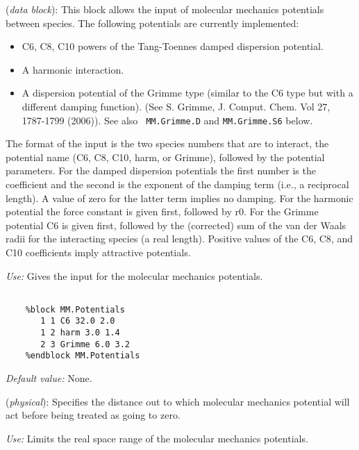 \documentclass[11pt]{article}
\begin{document}
\begin{description}
\itemsep 10pt
\parsep 0pt

\item[{\bf MM.Potentials}] ({\it data block}):
 This block allows the input
of molecular mechanics potentials between species. The following
potentials are currently implemented:
\begin{itemize}
\item C6, C8, C10 powers of the Tang-Toennes damped dispersion
  potential.
\item A harmonic interaction.
\item A dispersion potential of the Grimme type (similar to the C6
  type but with a different damping function). (See S. Grimme,
  J. Comput. Chem. Vol 27, 1787-1799 (2006)). See also {\tt
  MM.Grimme.D} and {\tt MM.Grimme.S6} below.
\end{itemize}

The format of the input is the two species numbers that are to
interact, the potential name (C6, C8, C10, harm, or Grimme), followed
by the potential parameters. For the damped dispersion potentials the
first number is the coefficient and the second is the exponent of the
damping term (i.e., a reciprocal length). A value of zero for the
latter term implies no damping. For the harmonic potential the force
constant is given first, followed by r0. For the Grimme potential C6
is given first, followed by the (corrected) sum of the van der Waals
radii for the interacting species (a real length). Positive values of
the C6, C8, and C10 coefficients imply attractive potentials.

{\it Use:} Gives the input for the molecular mechanics potentials.

\begin{verbatim}

    %block MM.Potentials
       1 1 C6 32.0 2.0
       1 2 harm 3.0 1.4
       2 3 Grimme 6.0 3.2
    %endblock MM.Potentials

\end{verbatim}

{\it Default value:}  None.

\item[{\bf MM.Cutoff}] ({\it physical}):  Specifies the distance out to which molecular mechanics
potential will act before being treated as going to zero.

{\it Use:} Limits the real space range of the molecular mechanics
potentials.


\end{description}
\end{document}
